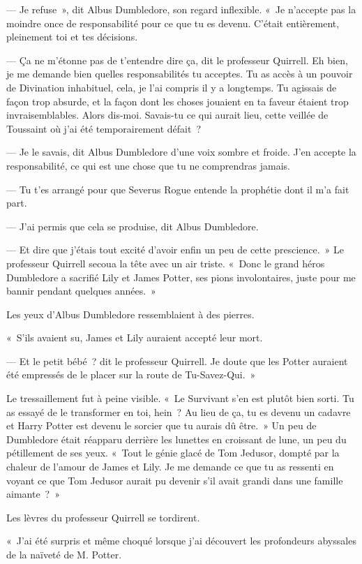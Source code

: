 --- Je refuse~», dit Albus Dumbledore, son regard inflexible.
«~Je n'accepte pas la moindre once de responsabilité pour ce que tu es devenu.
C'était entièrement, pleinement toi et tes décisions.

--- Ça ne m'étonne pas de t'entendre dire ça, dit le professeur Quirrell.
Eh bien, je me demande bien quelles responsabilités tu acceptes.
Tu as accès à un pouvoir de Divination inhabituel, cela, je l'ai compris il y a longtemps.
Tu agissais de façon trop absurde, et la façon dont les choses jouaient en ta faveur étaient trop invraisemblables.
Alors dis-moi.
Savais-tu ce qui aurait lieu, cette veillée de Toussaint où j'ai été temporairement défait~?

--- Je le savais, dit Albus Dumbledore d'une voix sombre et froide.
J'en accepte la responsabilité, ce qui est une chose que tu ne comprendras jamais.

--- Tu t'es arrangé pour que Severus Rogue entende la prophétie dont il m'a fait part.

--- J'ai permis que cela se produise, dit Albus Dumbledore.

--- Et dire que j'étais tout excité d'avoir enfin un peu de cette prescience.~»
Le professeur Quirrell secoua la tête avec un air triste.
«~Donc le grand héros Dumbledore a sacrifié Lily et James Potter, ses pions involontaires, juste pour me bannir pendant quelques années.~»

Les yeux d'Albus Dumbledore ressemblaient à des pierres.

«~S'ils avaient su, James et Lily auraient accepté leur mort.

--- Et le petit bébé~? dit le professeur Quirrell.
Je doute que les Potter auraient été empressés de le placer sur la route de Tu-Savez-Qui.~»

Le tressaillement fut à peine visible.
«~Le Survivant s'en est plutôt bien sorti.
Tu as essayé de le transformer en toi, hein~?
Au lieu de ça, tu es devenu un cadavre et Harry Potter est devenu le sorcier que tu aurais dû être.~»
Un peu de Dumbledore était réapparu derrière les lunettes en croissant de lune, un peu du pétillement de ses yeux.
«~Tout le génie glacé de Tom Jedusor, dompté par la chaleur de l'amour de James et Lily.
Je me demande ce que tu as ressenti en voyant ce que Tom Jedusor aurait pu devenir s'il avait grandi dans une famille aimante~?~»

Les lèvres du professeur Quirrell se tordirent.

«~J'ai été surpris et même choqué lorsque j'ai découvert les profondeurs abyssales de la naïveté de M. Potter.

